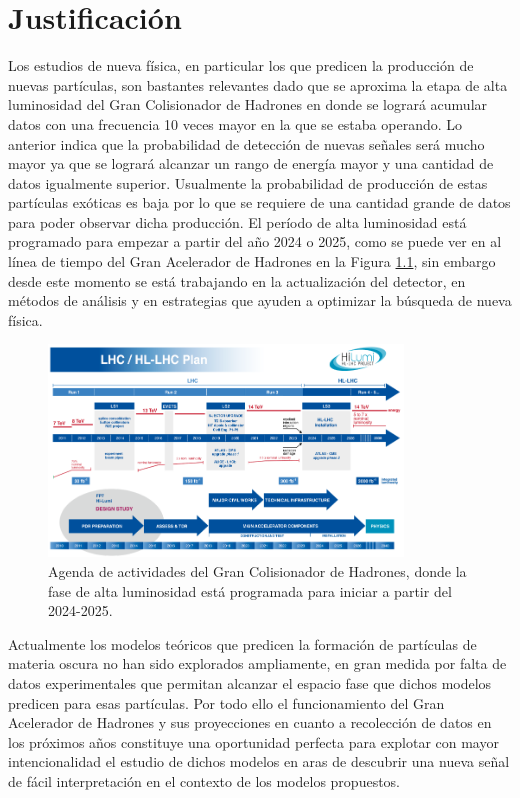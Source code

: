 \chapter{Justificación}

Los estudios de nueva física, en particular los que predicen la producción de nuevas partículas, son bastantes relevantes dado que se aproxima la etapa de alta luminosidad del Gran Colisionador de Hadrones en donde se logrará acumular datos con una frecuencia 10 veces mayor en la que se estaba operando. Lo anterior indica que la probabilidad de detección de nuevas señales será mucho mayor ya que se logrará alcanzar un rango de energía mayor y una cantidad de datos igualmente superior. Usualmente la probabilidad de producción de estas partículas exóticas es baja por lo que se requiere de una cantidad grande de datos para poder observar dicha producción. El período de alta luminosidad está programado para empezar a partir del año 2024 o 2025, como se puede ver en al línea de tiempo del Gran Acelerador de Hadrones en la Figura \ref{fig:LHC_timeline}, sin embargo desde este momento se está trabajando en la actualización del detector, en métodos de análisis y en estrategias que ayuden a optimizar la búsqueda de nueva física.

\begin{figure}
    \centering
    \includegraphics[width=0.84\textwidth]{JUSTIFICACION/LHC_timeline.png}
    \caption{Agenda de actividades del Gran Colisionador de Hadrones, donde la fase de alta luminosidad está programada para iniciar a partir del 2024-2025.}
    \label{fig:LHC_timeline}
\end{figure}

Actualmente los modelos teóricos que predicen la formación de partículas de materia oscura no han sido explorados ampliamente, en gran medida por falta de datos experimentales que permitan alcanzar el espacio fase que dichos modelos predicen para esas partículas. Por todo ello el funcionamiento del Gran Acelerador de Hadrones y sus proyecciones en cuanto a recolección de datos en los próximos años constituye una oportunidad perfecta para explotar con mayor intencionalidad el estudio de dichos modelos en aras de descubrir una nueva señal de fácil interpretación en el contexto de los modelos propuestos. 


